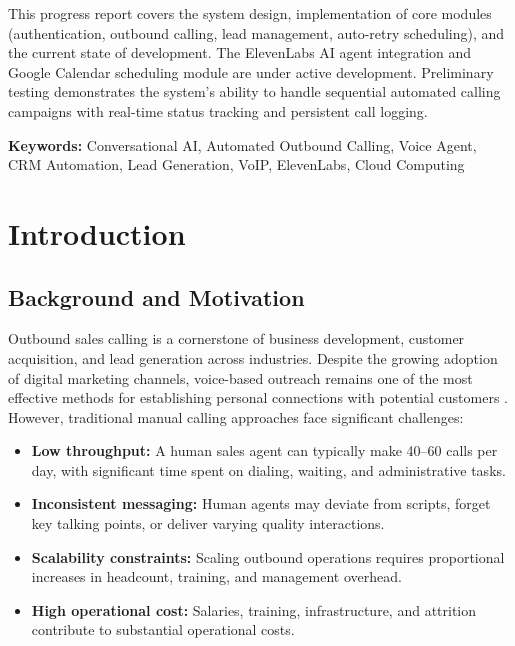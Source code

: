 \documentclass[12pt,a4paper,oneside]{book}
\begin{document}
This progress report covers the system design, implementation of core modules (authentication, outbound calling, lead management, auto-retry scheduling), and the current state of development. The ElevenLabs AI agent integration and Google Calendar scheduling module are under active development. Preliminary testing demonstrates the system's ability to handle sequential automated calling campaigns with real-time status tracking and persistent call logging.

\textbf{Keywords:} Conversational AI, Automated Outbound Calling, Voice Agent, CRM Automation, Lead Generation, VoIP, ElevenLabs, Cloud Computing

\newpage\thispagestyle{empty}\mbox{}\newpage

\frontmatter
\tableofcontents
\listoftables
\listoffigures

\printglossary[type=\acronymtype,title={List of Abbreviations}]

\mainmatter

\chapter{Introduction}

\section{Background and Motivation}

Outbound sales calling is a cornerstone of business development, customer acquisition, and lead generation across industries. Despite the growing adoption of digital marketing channels, voice-based outreach remains one of the most effective methods for establishing personal connections with potential customers \citep{salesforce2023}. However, traditional manual calling approaches face significant challenges:

\begin{itemize}
    \item \textbf{Low throughput:} A human sales agent can typically make 40--60 calls per day, with significant time spent on dialing, waiting, and administrative tasks.
    \item \textbf{Inconsistent messaging:} Human agents may deviate from scripts, forget key talking points, or deliver varying quality interactions.
    \item \textbf{Scalability constraints:} Scaling outbound operations requires proportional increases in headcount, training, and management overhead.
    \item \textbf{High operational cost:} Salaries, training, infrastructure, and attrition contribute to substantial operational costs.
\end{itemize}
\end{document}
